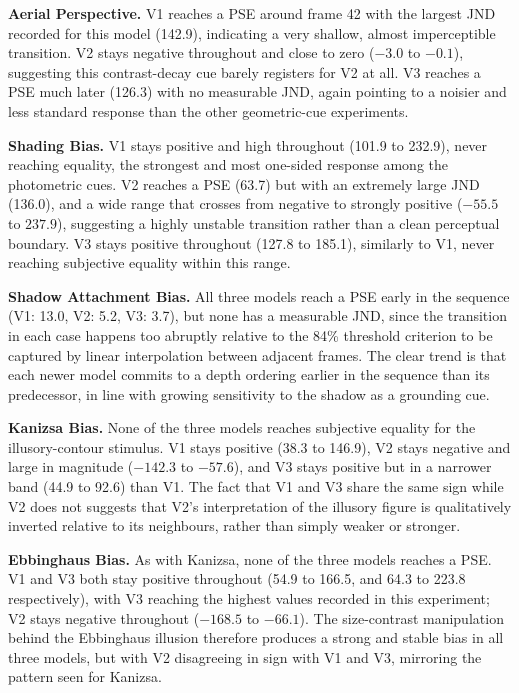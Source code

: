 \documentclass[10pt,twocolumn]{article}
\begin{document}
\textbf{Aerial Perspective.} V1 reaches a PSE around frame 42 with the largest JND
recorded for this model (142.9), indicating a very shallow, almost imperceptible
transition. V2 stays negative throughout and close to zero ($-3.0$ to $-0.1$), suggesting
this contrast-decay cue barely registers for V2 at all. V3 reaches a PSE much later
(126.3) with no measurable JND, again pointing to a noisier and less standard response
than the other geometric-cue experiments.

\textbf{Shading Bias.} V1 stays positive and high throughout (101.9 to 232.9), never
reaching equality, the strongest and most one-sided response among the photometric
cues. V2 reaches a PSE (63.7) but with an extremely large JND (136.0), and a wide range
that crosses from negative to strongly positive ($-55.5$ to $237.9$), suggesting a highly
unstable transition rather than a clean perceptual boundary. V3 stays positive throughout
(127.8 to 185.1), similarly to V1, never reaching subjective equality within this range.

\textbf{Shadow Attachment Bias.} All three models reach a PSE early in the sequence (V1:
13.0, V2: 5.2, V3: 3.7), but none has a measurable JND, since the transition in each case
happens too abruptly relative to the 84\% threshold criterion to be captured by linear
interpolation between adjacent frames. The clear trend is that each newer model commits
to a depth ordering earlier in the sequence than its predecessor, in line with growing
sensitivity to the shadow as a grounding cue.

\textbf{Kanizsa Bias.} None of the three models reaches subjective equality for the
illusory-contour stimulus. V1 stays positive (38.3 to 146.9), V2 stays negative and large
in magnitude ($-142.3$ to $-57.6$), and V3 stays positive but in a narrower band (44.9
to 92.6) than V1. The fact that V1 and V3 share the same sign while V2 does not suggests
that V2's interpretation of the illusory figure is qualitatively inverted relative to its
neighbours, rather than simply weaker or stronger.

\textbf{Ebbinghaus Bias.} As with Kanizsa, none of the three models reaches a PSE. V1 and
V3 both stay positive throughout (54.9 to 166.5, and 64.3 to 223.8 respectively), with V3
reaching the highest values recorded in this experiment; V2 stays negative throughout
($-168.5$ to $-66.1$). The size-contrast manipulation behind the Ebbinghaus illusion
therefore produces a strong and stable bias in all three models, but with V2 disagreeing
in sign with V1 and V3, mirroring the pattern seen for Kanizsa.
\end{document}
